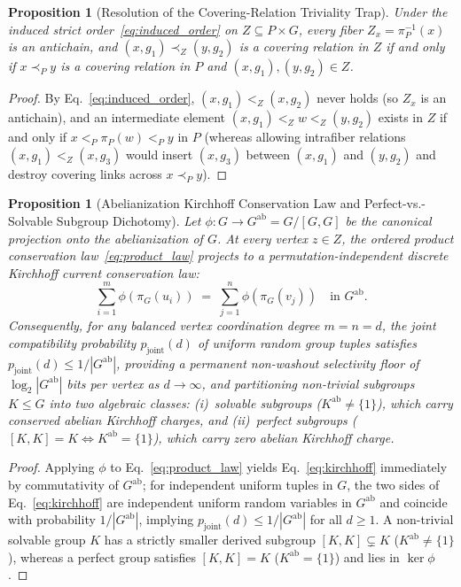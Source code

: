 \documentclass[11pt,a4paper]{article}
\newtheorem{proposition}[theorem]{Proposition}
\theoremstyle{definition}
\theoremstyle{remark}
\begin{document}
\begin{proposition}[Resolution of the Covering-Relation Triviality Trap]
\label{prop:triviality_trap}
Under the induced strict order~\eqref{eq:induced_order} on $Z \subseteq P \times G$, every fiber $Z_x = \pi_P^{-1}(x)$ is an antichain, and $(x, g_1) \prec_Z (y, g_2)$ is a covering relation in $Z$ if and only if $x \prec_P y$ is a covering relation in $P$ and $(x, g_1), (y, g_2) \in Z$.
\end{proposition}

\begin{proof}
By Eq.~\eqref{eq:induced_order}, $(x, g_1) <_Z (x, g_2)$ never holds (so $Z_x$ is an antichain), and an intermediate element $(x, g_1) <_Z w <_Z (y, g_2)$ exists in $Z$ if and only if $x <_P \pi_P(w) <_P y$ in $P$ (whereas allowing intrafiber relations $(x, g_1) <_Z (x, g_3)$ would insert $(x, g_3)$ between $(x, g_1)$ and $(y, g_2)$ and destroy covering links across $x \prec_P y$).
\end{proof}

\begin{proposition}[Abelianization Kirchhoff Conservation Law and Perfect-vs.-Solvable Subgroup Dichotomy]
\label{prop:kirchhoff}
Let $\phi : G \to G^{\mathrm{ab}} = G / [G,G]$ be the canonical projection onto the abelianization of $G$. At every vertex $z \in Z$, the ordered product conservation law~\eqref{eq:product_law} projects to a permutation-independent discrete Kirchhoff current conservation law:
\begin{equation}
\label{eq:kirchhoff}
\sum_{i=1}^m \phi(\pi_G(u_i)) \;=\; \sum_{j=1}^n \phi(\pi_G(v_j)) \quad \text{in } G^{\mathrm{ab}}.
\end{equation}
Consequently, for any balanced vertex coordination degree $m = n = d$, the joint compatibility probability $p_{\mathrm{joint}}(d)$ of uniform random group tuples satisfies $p_{\mathrm{joint}}(d) \le 1/|G^{\mathrm{ab}}|$, providing a permanent non-washout selectivity floor of $\log_2|G^{\mathrm{ab}}|$ bits per vertex as $d \to \infty$, and partitioning non-trivial subgroups $K \le G$ into two algebraic classes: (i)~\emph{solvable} subgroups ($K^{\mathrm{ab}} \neq \{1\}$), which carry conserved abelian Kirchhoff charges, and (ii)~\emph{perfect} subgroups ($[K, K] = K \iff K^{\mathrm{ab}} = \{1\}$), which carry zero abelian Kirchhoff charge.
\end{proposition}

\begin{proof}
Applying $\phi$ to Eq.~\eqref{eq:product_law} yields Eq.~\eqref{eq:kirchhoff} immediately by commutativity of $G^{\mathrm{ab}}$; for independent uniform tuples in $G$, the two sides of Eq.~\eqref{eq:kirchhoff} are independent uniform random variables in $G^{\mathrm{ab}}$ and coincide with probability $1/|G^{\mathrm{ab}}|$, implying $p_{\mathrm{joint}}(d) \le 1/|G^{\mathrm{ab}}|$ for all $d \ge 1$. A non-trivial solvable group $K$ has a strictly smaller derived subgroup $[K,K] \subsetneq K$ ($K^{\mathrm{ab}} \neq \{1\}$), whereas a perfect group satisfies $[K,K] = K$ ($K^{\mathrm{ab}} = \{1\}$) and lies in $\ker\phi$.
\end{proof}
\end{document}
